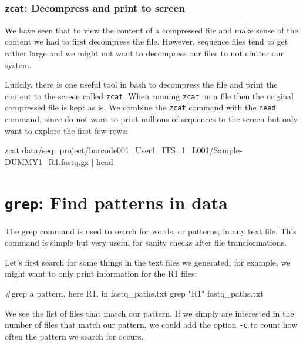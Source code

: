 \documentclass[
  letterpaper,
  DIV=11,
  numbers=noendperiod]{scrreprt}
\newenvironment{Shaded}{}{}
\newcommand{\CommentTok}[1]{\textcolor[rgb]{0.42,0.45,0.49}{#1}}
\newcommand{\FunctionTok}[1]{\textcolor[rgb]{0.44,0.26,0.76}{#1}}
\newcommand{\KeywordTok}[1]{\textcolor[rgb]{0.84,0.23,0.29}{#1}}
\newcommand{\NormalTok}[1]{\textcolor[rgb]{0.14,0.16,0.18}{#1}}
\newcommand{\StringTok}[1]{\textcolor[rgb]{0.01,0.18,0.38}{#1}}
\begin{document}
\subsubsection{\texorpdfstring{\texttt{zcat}: Decompress and print to
screen}{zcat: Decompress and print to screen}}\label{zcat-decompress-and-print-to-screen}

We have seen that to view the content of a compressed file and make
sense of the content we had to first decompress the file. However,
sequence files tend to get rather large and we might not want to
decompress our files to not clutter our system.

Luckily, there is one useful tool in bash to decompress the file and
print the content to the screen called \texttt{zcat}. When running
\texttt{zcat} on a file then the original compressed file is kept as is.
We combine the \texttt{zcat} command with the \texttt{head} command,
since do not want to print millions of sequences to the screen but only
want to explore the first few rows:

\begin{Shaded}
\begin{Highlighting}[]
\FunctionTok{zcat}\NormalTok{ data/seq\_project/barcode001\_User1\_ITS\_1\_L001/Sample{-}DUMMY1\_R1.fastq.gz }\KeywordTok{|} \FunctionTok{head}
\end{Highlighting}
\end{Shaded}

\section{\texorpdfstring{\texttt{grep}: Find patterns in
data}{grep: Find patterns in data}}\label{grep-find-patterns-in-data}

The grep command is used to search for words, or patterns, in any text
file. This command is simple but very useful for sanity checks after
file transformations.

Let's first search for some things in the text files we generated, for
example, we might want to only print information for the R1 files:

\begin{Shaded}
\begin{Highlighting}[]
\CommentTok{\#grep a pattern, here R1, in fastq\_paths.txt}
\FunctionTok{grep} \StringTok{"R1"}\NormalTok{ fastq\_paths.txt}
\end{Highlighting}
\end{Shaded}

We see the list of files that match our pattern. If we simply are
interested in the number of files that match our pattern, we could add
the option \texttt{-c} to count how often the pattern we search for
occurs.
\end{document}
